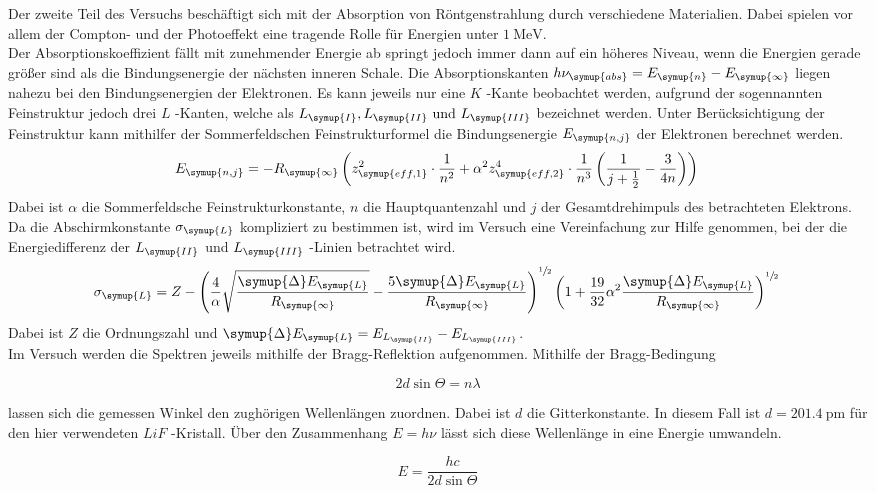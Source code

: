 \newpage
Der zweite Teil des Versuchs beschäftigt sich mit der Absorption von Röntgenstrahlung durch
verschiedene Materialien. Dabei spielen vor allem der Compton- und der Photoeffekt eine
tragende Rolle für Energien unter $\SI{1}{\mega\electronvolt}$.\\
Der Absorptionskoeffizient fällt mit zunehmender Energie ab springt jedoch immer dann
auf ein höheres Niveau, wenn die Energien gerade größer sind als die Bindungsenergie der
nächsten inneren Schale. Die Absorptionskanten $h\nu_\symup{abs} = E_\symup{n} - E_\symup{\infty}$
liegen nahezu bei den Bindungsenergien der Elektronen. Es kann jeweils nur eine $K$ -Kante
beobachtet werden, aufgrund der sogennannten Feinstruktur jedoch drei $L$ -Kanten,
welche als $L_\symup{I},L_\symup{II} \text{ und } L_\symup{III}$
bezeichnet werden. Unter Berücksichtigung der Feinstruktur kann mithilfer der
Sommerfeldschen Feinstrukturformel die Bindungsenergie $E_\symup{n,j}$ der Elektronen
berechnet werden.
\begin{equation}
  E_\symup{n,j} = -R_\symup{\infty} \left(z_\symup{eff,1}^2 \cdot \dfrac{1}{n^2}
  + \alpha^2 z_\symup{eff,2}^4 \cdot \dfrac{1}{n^3}\left(\dfrac{1}{j+\frac{1}{2}}-
  \dfrac{3}{4n}\right)\right)
  \label{eqn:E_n,j}\\
\end{equation}
Dabei ist $\alpha$ die Sommerfeldsche Feinstrukturkonstante, $n$ die Hauptquantenzahl und
$j$ der Gesamtdrehimpuls des betrachteten Elektrons. Da die Abschirmkonstante $\sigma_\symup{L}$
kompliziert zu bestimmen ist, wird im Versuch eine Vereinfachung zur Hilfe genommen,
bei der die Energiedifferenz der $L_\symup{II}$ und $L_\symup{III}$ -Linien betrachtet wird.
\begin{equation}
  \sigma_\symup{L} = Z - \left(\dfrac{4}{\alpha}\sqrt{\dfrac{\symup{\Delta} E_\symup{L}}{R_\symup{\infty}}}
  - \dfrac{5 \symup{\Delta} E_\symup{L} }{R_\symup{\infty}} \right)^{\sfrac{1}{2}}
  \left(1 + \dfrac{19}{32} \alpha^2 \dfrac{\symup{\Delta} E_\symup{L}}{R_\symup{\infty}} \right)^{\sfrac{1}{2}}
  \label{eqn:sigma_L}\\
\end{equation}
Dabei ist $Z$ die Ordnungszahl und $\symup{\Delta} E_\symup{L} = E_{L_\symup{II}} -E_{L_\symup{III}}$.\\
Im Versuch werden die Spektren jeweils mithilfe der Bragg-Reflektion aufgenommen. Mithilfe
der Bragg-Bedingung

\begin{equation}
  2 d \sin{\Theta} = n \lambda
  \label{eqn:bragg}
\end{equation}

lassen sich die gemessen Winkel den zughörigen Wellenlängen zuordnen. Dabei ist $d$ die
Gitterkonstante. In diesem Fall ist $d = \SI{201.4}{\pico\meter}$ für den hier verwendeten
$LiF$ -Kristall. Über den Zusammenhang $E=h\nu$ lässt sich diese Wellenlänge in eine
Energie umwandeln.

\begin{equation}
  E = \dfrac{hc}{2d\sin{\Theta}}
  \label{eqn:E}
\end{equation}
